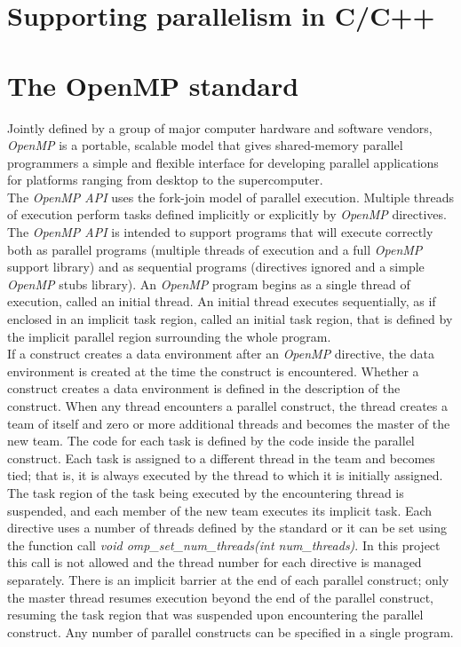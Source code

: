 \documentclass[a4paper,11pt,oneside]{book}
\begin{document}
\section{Supporting parallelism in C/C++}
\section{The OpenMP standard}

Jointly defined by a group of major computer hardware and software vendors, \emph{OpenMP} is a portable, scalable model that gives shared-memory parallel programmers a simple and flexible interface for developing parallel applications for platforms ranging from desktop to the supercomputer.\\
The \emph{OpenMP API} uses the fork-join model of parallel execution. Multiple threads of execution perform tasks defined implicitly or explicitly by \emph{OpenMP} directives. The \emph{OpenMP API} is intended to support programs that will execute correctly both as parallel programs (multiple threads of execution and a full \emph{OpenMP} support library) and as sequential programs (directives ignored and a simple \emph{OpenMP} stubs library).
An \emph{OpenMP} program begins as a single thread of execution, called an initial thread. An initial thread executes sequentially, as if enclosed in an implicit task region, called an initial task region, that is defined by the implicit parallel region surrounding the whole program.\\
If a construct creates a data environment after an \emph{OpenMP} directive, the data environment is created at the time the construct is encountered. Whether a construct creates a data environment is defined in the description of the construct. When any thread encounters a parallel construct, the thread creates a team of itself and zero or more additional threads and becomes the master of the new team. The code for each task is defined by the code inside the parallel construct. Each task is assigned to a different thread in the team and becomes tied; that is, it is always executed by the thread to which it is initially assigned. The task region of the task being executed by the encountering thread is suspended, and each member of the new team executes its implicit task. Each directive uses a number of threads defined by the standard or it can be set using the function call \emph{void omp\_set\_num\_threads(int num\_threads)}. In this project this call is not allowed and the thread number for each directive is managed separately. There is an implicit barrier at the end of each parallel construct; only the master thread resumes execution beyond the end of the parallel construct, resuming the task region that was suspended upon encountering the parallel construct. Any number of parallel constructs can be specified in a single program. \\
\end{document}
